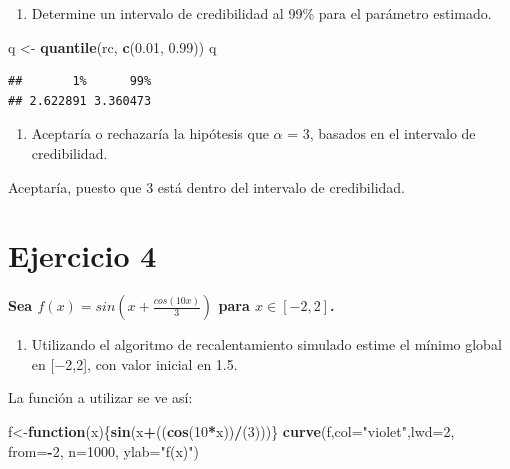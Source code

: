 \documentclass[
]{article}
\newenvironment{Shaded}{\begin{snugshade}}{\end{snugshade}}
\newcommand{\AttributeTok}[1]{\textcolor[rgb]{0.13,0.29,0.53}{#1}}
\newcommand{\ControlFlowTok}[1]{\textcolor[rgb]{0.13,0.29,0.53}{\textbf{#1}}}
\newcommand{\DecValTok}[1]{\textcolor[rgb]{0.00,0.00,0.81}{#1}}
\newcommand{\FloatTok}[1]{\textcolor[rgb]{0.00,0.00,0.81}{#1}}
\newcommand{\FunctionTok}[1]{\textcolor[rgb]{0.13,0.29,0.53}{\textbf{#1}}}
\newcommand{\NormalTok}[1]{#1}
\newcommand{\OtherTok}[1]{\textcolor[rgb]{0.56,0.35,0.01}{#1}}
\newcommand{\SpecialCharTok}[1]{\textcolor[rgb]{0.81,0.36,0.00}{\textbf{#1}}}
\newcommand{\StringTok}[1]{\textcolor[rgb]{0.31,0.60,0.02}{#1}}
\providecommand{\tightlist}{%
  \setlength{\itemsep}{0pt}\setlength{\parskip}{0pt}}
\begin{document}
\begin{enumerate}
\def\labelenumi{\alph{enumi}.}
\setcounter{enumi}{2}
\tightlist
\item
  Determine un intervalo de credibilidad al 99\% para el parámetro
  \alpha estimado.
\end{enumerate}

\begin{Shaded}
\begin{Highlighting}[]
\NormalTok{q }\OtherTok{\textless{}{-}} \FunctionTok{quantile}\NormalTok{(rc, }\FunctionTok{c}\NormalTok{(}\FloatTok{0.01}\NormalTok{, }\FloatTok{0.99}\NormalTok{))}
\NormalTok{q}
\end{Highlighting}
\end{Shaded}

\begin{verbatim}
##       1%      99% 
## 2.622891 3.360473
\end{verbatim}

\begin{enumerate}
\def\labelenumi{\alph{enumi}.}
\setcounter{enumi}{3}
\tightlist
\item
  Aceptaría o rechazaría la hipótesis que \(\alpha\) = 3, basados en el
  intervalo de credibilidad.
\end{enumerate}

Aceptaría, puesto que 3 está dentro del intervalo de credibilidad.

\hypertarget{ejercicio-4}{%
\section{Ejercicio 4}\label{ejercicio-4}}

\textbf{Sea \(f(x)=sin(x + \frac{cos(10x)}{3})\) para \(x \in [-2,2]\).
}

\begin{enumerate}
\def\labelenumi{\alph{enumi}.}
\tightlist
\item
  Utilizando el algoritmo de recalentamiento simulado estime el mínimo
  global en {[}−2,2{]}, con valor inicial en 1.5.
\end{enumerate}

La función a utilizar se ve así:

\begin{Shaded}
\begin{Highlighting}[]
\NormalTok{f}\OtherTok{\textless{}{-}}\ControlFlowTok{function}\NormalTok{(x)\{}\FunctionTok{sin}\NormalTok{(x}\SpecialCharTok{+}\NormalTok{((}\FunctionTok{cos}\NormalTok{(}\DecValTok{10}\SpecialCharTok{*}\NormalTok{x))}\SpecialCharTok{/}\NormalTok{(}\DecValTok{3}\NormalTok{)))\}}
\FunctionTok{curve}\NormalTok{(f,}\AttributeTok{col=}\StringTok{"violet"}\NormalTok{,}\AttributeTok{lwd=}\DecValTok{2}\NormalTok{, }\AttributeTok{from=}\SpecialCharTok{{-}}\DecValTok{2}\NormalTok{, }\AttributeTok{n=}\DecValTok{1000}\NormalTok{, }\AttributeTok{ylab=}\StringTok{"f(x)"}\NormalTok{)}
\end{Highlighting}
\end{Shaded}
\end{document}
